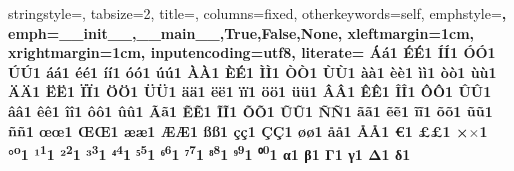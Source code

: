 {	stringstyle=\color{stringColor},              %
	tabsize=2,                                    %
	title=\lstname,                               %
	columns=fixed,                                %
	otherkeywords={self},                         %
	emphstyle=\color{customColor}\bfseries,       %
	emph={__init__,__main__,True,False,None},     %
	xleftmargin=1cm,                              %
	xrightmargin=1cm,                             %
	inputencoding=utf8,
	literate={%
	            {Á}{{\'a}}1 {É}{{\'E}}1 {Í}{{\'I}}1 {Ó}{{\'O}}1 {Ú}{{\'U}}1%
	            {á}{{\'a}}1 {é}{{\'e}}1 {í}{{\'i}}1 {ó}{{\'o}}1 {ú}{{\'u}}1%
	            {À}{{\`A}}1 {È}{{\'E}}1 {Ì}{{\`I}}1 {Ò}{{\`O}}1 {Ù}{{\`U}}1%
	            {à}{{\`a}}1 {è}{{\`e}}1 {ì}{{\`i}}1 {ò}{{\`o}}1 {ù}{{\`u}}1%
	            {Ä}{{\"A}}1 {Ë}{{\"E}}1 {Ï}{{\"I}}1 {Ö}{{\"O}}1 {Ü}{{\"U}}1%
	            {ä}{{\"a}}1 {ë}{{\"e}}1 {ï}{{\"i}}1 {ö}{{\"o}}1 {ü}{{\"u}}1%
	            {Â}{{\^A}}1 {Ê}{{\^E}}1 {Î}{{\^I}}1 {Ô}{{\^O}}1 {Û}{{\^U}}1%
	            {â}{{\^a}}1 {ê}{{\^e}}1 {î}{{\^i}}1 {ô}{{\^o}}1 {û}{{\^u}}1%
	            {Ã}{{\~a}}1 {Ẽ}{{\~E}}1 {Ĩ}{{\~I}}1 {Õ}{{\~O}}1 {Ũ}{{\~U}}1 {Ñ}{{\~N}}1%
	            {ã}{{\~a}}1 {ẽ}{{\~e}}1 {ĩ}{{\~i}}1 {õ}{{\~o}}1 {ũ}{{\~u}}1 {ñ}{{\~n}}1%
	            {œ}{{\oe}}1 {Œ}{{\OE}}1 {æ}{{\ae}}1 {Æ}{{\AE}}1 {ß}{{\ss}}1%
	            {ç}{{\c c}}1 {Ç}{{\c C}}1 {ø}{{\o}}1 {å}{{\r a}}1 {Å}{{\r A}}1%
	            {€}{{\EUR}}1 {£}{{\pounds}}1 {×}{{\(\times\)}}1%
	            {°}{{\textsuperscript{o}}}1%
	            {¹}{{\textsuperscript{1}}}1%
	            {²}{{\textsuperscript{2}}}1%
	            {³}{{\textsuperscript{3}}}1%
	            {⁴}{{\textsuperscript{4}}}1%
	            {⁵}{{\textsuperscript{5}}}1%
	            {⁶}{{\textsuperscript{6}}}1%
	            {⁷}{{\textsuperscript{7}}}1%
	            {⁸}{{\textsuperscript{8}}}1%
	            {⁹}{{\textsuperscript{9}}}1%
	            {⁰}{{\textsuperscript{0}}}1%
	            {α}{{\textalpha}}1%
	            {β}{{\textbeta}}1%
	            {Γ}{{\textGamma}}1
	            {γ}{{\textgamma}}1%
	            {Δ}{{\textDelta}}1
	            {δ}{{\textdelta}}1%
}}
